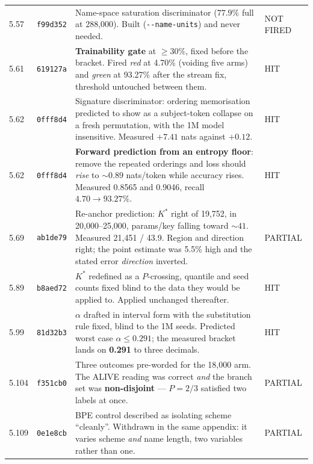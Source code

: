{\begin{longtable}{@{}p{0.9cm}p{1.7cm}p{8.4cm}p{2.3cm}@{}}
5.57 & \texttt{f99d352} & Name-space saturation discriminator ($77.9\%$ full at 288{,}000). Built
(\texttt{-{}-name-units}) and never needed. & NOT FIRED \\

5.61 & \texttt{619127a} & \textbf{Trainability gate} at $\ge 30\%$, fixed before the bracket. Fired
\emph{red} at 4.70\% (voiding five arms) and \emph{green} at 93.27\% after the stream fix, threshold
untouched between them. & HIT \\

5.62 & \texttt{0fff8d4} & Signature discriminator: ordering memorisation predicted to show as a
subject-token collapse on a fresh permutation, with the 1M model insensitive. Measured $+7.41$ nats
against $+0.12$. & HIT \\

5.62 & \texttt{0fff8d4} & \textbf{Forward prediction from an entropy floor}: remove the repeated
orderings and loss should \emph{rise} to ${\sim}0.89$ nats/token while accuracy rises. Measured
0.8565 and 0.9046, recall $4.70 \to 93.27\%$. & HIT \\

5.69 & \texttt{ab1de79} & Re-anchor prediction: $K^*$ right of 19{,}752, in 20{,}000--25{,}000,
params/key falling toward ${\sim}41$. Measured 21{,}451 / 43.9. Region and direction right; the point
estimate was 5.5\% high and the stated error \emph{direction} inverted. & PARTIAL \\

5.89 & \texttt{b8aed72} & $K^*$ redefined as a $P$-crossing, quantile and seed counts fixed blind to
the data they would be applied to. Applied unchanged thereafter. & HIT \\

5.99 & \texttt{81d32b3} & $\alpha$ drafted in interval form with the substitution rule fixed, blind to
the 1M seeds. Predicted worst case $\alpha \le 0.291$; the measured bracket lands on \textbf{0.291}
to three decimals. & HIT \\

5.104 & \texttt{f351cb0} & Three outcomes pre-worded for the 18{,}000 arm. The ALIVE reading was
correct \emph{and} the branch set was \textbf{non-disjoint} --- $P = 2/3$ satisfied two labels at
once. & PARTIAL \\

5.109 & \texttt{0e1e8cb} & BPE control described as isolating scheme ``cleanly''. Withdrawn in the
same appendix: it varies scheme \emph{and} name length, two variables rather than one. & PARTIAL \\


\end{longtable}}
